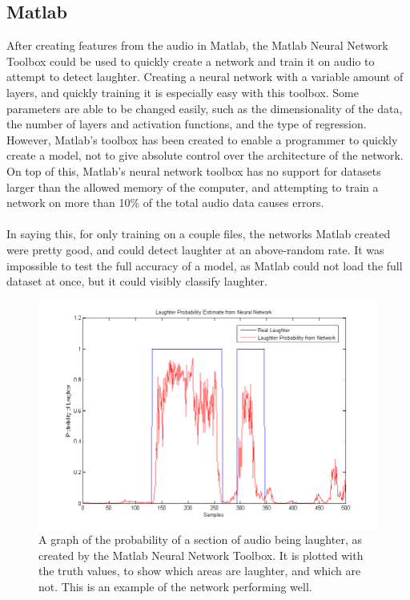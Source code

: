 \documentclass[a4paper,11pt,notitlepage]{article}
\begin{document}
\subsection{Matlab}\label{section:Matlab}
After creating features from the audio in Matlab, the Matlab Neural Network Toolbox could be used to quickly create a network and train it on audio to attempt to detect laughter. Creating a neural network with a variable amount of layers, and quickly training it is especially easy with this toolbox. Some parameters are able to be changed easily, such as the dimensionality of the data, the number of layers and activation functions, and the type of regression. However, Matlab's toolbox has been created to enable a programmer to quickly create a model, not to give absolute control over the architecture of the network. On top of this, Matlab's neural network toolbox has no support for datasets larger than the allowed memory of the computer, and attempting to train a network on more than 10\% of the total audio data causes errors.\\
\\
In saying this, for only training on a couple files, the networks Matlab created were pretty good, and could detect laughter at an above-random rate. It was impossible to test the full accuracy of a model, as Matlab could not load the full dataset at once, but it could visibly classify laughter.

\begin{figure}[H]
	\centering
	\vspace{0.5cm}
	\includegraphics[scale = 0.6]{figs/prob_of_laughter.png}
	\caption{A graph of the probability of a section of audio being laughter, as created by the Matlab Neural Network Toolbox. It is plotted with the truth values, to show which areas are laughter, and which are not. This is an example of the network performing well.}
	\label{matlab_nn_probability}
\end{figure}
\end{document}
